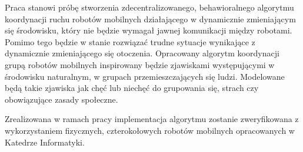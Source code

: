 Praca  stanowi próbę stworzenia zdecentralizowanego, behawioralnego  algorytmu koordynacji ruchu robotów mobilnych działającego w dynamicznie zmieniającym się środowisku, który nie będzie wymagał jawnej komunikacji między robotami. Pomimo tego będzie w stanie rozwiązać trudne sytuacje wynikające z dynamicznie zmieniającego się otoczenia.
Opracowany algorytm koordynacji grupą robotów mobilnych inspirowany będzie zjawiskami występującymi w środowisku naturalnym, w grupach przemieszczających się ludzi. Modelowane będą takie zjawiska jak chęć lub niechęć do grupowania się, strach czy obowiązujące zasady społeczne.

Zrealizowana w ramach pracy implementacja algorytmu zostanie zweryfikowana z wykorzystaniem fizycznych, czterokołowych robotów mobilnych opracowanych w Katedrze Informatyki.
